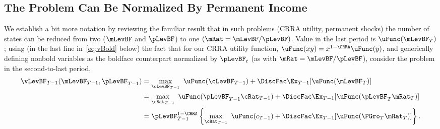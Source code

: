 \documentclass[ProjectDLO]{subfiles}
\begin{document}
\hypertarget{The-Problem-Can-Be-Rewritten-in-Ratio-Form}{}
\hypertarget{The-Problem-Can-Be-Normalized-By-Permanent-Income}{}
\subsection{The Problem Can Be Normalized By Permanent Income}\label{subsec:ratio}

We establish a bit more notation by reviewing the familiar result that in such problems (CRRA utility, permanent shocks) the number of states can be reduced from two ($\mLevBF$ and $\pLevBF$) to one $(\mRat = \mLevBF/\pLevBF)$.  Value in the last period is $\uFunc(\mLevBF_{T})$; using (in the last line in~\eqref{eq:vBold} below) the fact that for our CRRA utility function, $\uFunc(xy) = x^{1-\CRRA}\uFunc(y)$, and generically defining nonbold variables as the boldface counterpart normalized by $\pLevBF_{t}$ (as with $\mRat=\mLevBF/\pLevBF$), consider the problem in the second-to-last period,
\begin{align}
  \vLevBF_{T-1}(\mLevBF_{T-1},\pLevBF_{T-1})  & =
                                                \max_{\cLevBF_{T-1}}~ \uFunc(\cLevBF_{T-1}) +\DiscFac \Ex_{T-1} [ \uFunc(\mLevBF_{T})]
                                                \notag \\
                                              & =  \max_{\cRat_{T-1}}~
                                                \uFunc(\pLevBF_{T-1}\cRat_{T-1}) + \DiscFac  \Ex_{T-1} [\uFunc(\pLevBF_{T}{\mRat}
                                                _{T})]  \notag \\
                                              & = \pLevBF_{T-1}^{1-\CRRA}
                                                \left\{\max_{\cRat_{T-1}}~ \uFunc(c_{T-1}) + \DiscFac \Ex_{T-1} [ \uFunc( {\PGro}_{T}
                                                {\mRat}_{T}) ] \right\}.   \label{eq:vBold}
\end{align}

\hypertarget{The-Related-Problem}{}
\end{document}
